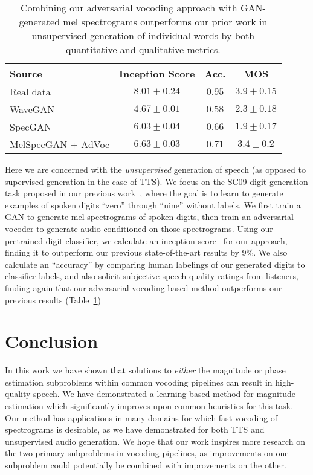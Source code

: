 \documentclass[a4paper]{article}
\begin{document}
\begingroup
\setlength{\tabcolsep}{6pt}
\begin{table}[htbp]
\centering
\caption{Combining our adversarial vocoding approach with GAN-generated mel spectrograms outperforms our prior work in unsupervised generation of individual words by both quantitative and qualitative metrics.}
\vspace{2mm}
\footnotesize
\begin{tabular}{lccc}
\toprule
Source & Inception Score & Acc. & MOS  \\
\midrule
Real data & $8.01 \pm 0.24$ & $0.95$ & $3.9 \pm 0.15$ \\
WaveGAN \cite{donahue2019wavegan} & $4.67 \pm 0.01$ & $0.58$ & $2.3 \pm 0.18$   \\
SpecGAN \cite{donahue2019wavegan} & $6.03 \pm 0.04$ & $0.66$ & $1.9 \pm 0.17$ \\
MelSpecGAN + AdVoc & $6.63 \pm 0.03$ & $0.71$ & $3.4 \pm 0.2$ \\
\bottomrule
\end{tabular} 
\label{tab:sc09Small}
\end{table}
\endgroup

Here we are concerned with the \emph{unsupervised} generation of speech (as opposed to supervised generation in the case of TTS). 
We focus on the SC09 digit generation task proposed in our previous work~\cite{donahue2019wavegan}, 
where the goal is to learn to generate examples of spoken digits ``zero'' through ``nine'' without labels. 
We first train a GAN to generate mel spectrograms of spoken digits, then train an adversarial vocoder to generate audio conditioned on those spectrograms. 
Using our pretrained digit classifier, we calculate an inception score~\cite{salimans2016improved} for our approach, finding it to outperform our previous state-of-the-art results by $9$\%. 
We also calculate an ``accuracy'' by comparing human labelings of our generated digits to classifier labels, and also solicit subjective speech quality ratings from listeners, finding again that our adversarial vocoding-based method outperforms our previous results (Table~\ref{tab:sc09Small})

\section{Conclusion}

In this work we have shown that solutions to \emph{either} the magnitude or phase estimation subproblems within common vocoding pipelines can result in high-quality speech. 
We have demonstrated a learning-based method for magnitude estimation which significantly improves upon common heuristics for this task. 
Our method has applications in many domains for which fast vocoding of spectrograms is desirable, as we have demonstrated for both TTS and unsupervised audio generation. 
We hope that our work inspires more research on the two primary subproblems in vocoding pipelines, as improvements on one subproblem could potentially be combined with improvements on the other.
\end{document}
